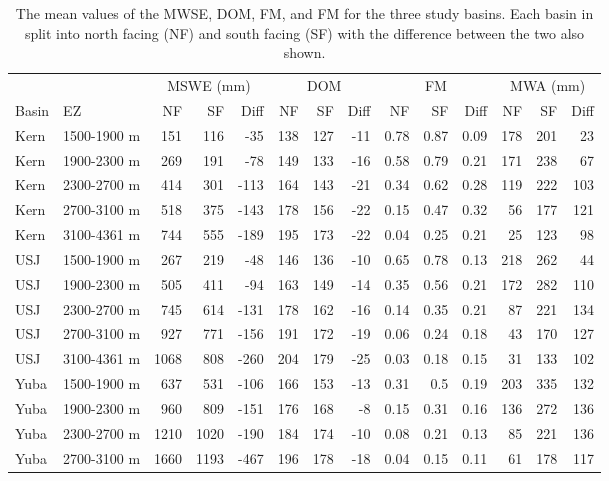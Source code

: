 \begin{table}[htbp]
\centering
\caption{The mean values of the MWSE, DOM, FM, and FM for the three study basins. Each basin in split into north facing (NF) and south facing (SF) with the difference between the two also shown.}
\label{tab:snow_metric_table}
\tiny %
\begin{tabular}{llrrrrrrrrrrrr}
\toprule
& & \multicolumn{3}{c}{MSWE (mm)} & \multicolumn{3}{c}{DOM} & \multicolumn{3}{c}{FM} & \multicolumn{3}{c}{MWA (mm)} \\
\cmidrule(c){3-5} \cmidrule(lr){6-8} \cmidrule(lr){9-11} \cmidrule(lr){12-14} 
Basin & EZ & NF & SF & Diff & NF & SF & Diff & NF & SF & Diff & NF & SF & Diff \\
\midrule
Kern & 1500-1900 m & 151 & 116 & -35 & 138 & 127 & -11 & 0.78 & 0.87 & 0.09 & 178 & 201 & 23 \\
Kern & 1900-2300 m & 269 & 191 & -78 & 149 & 133 & -16 & 0.58 & 0.79 & 0.21 & 171 & 238 & 67 \\
Kern & 2300-2700 m & 414 & 301 & -113 & 164 & 143 & -21 & 0.34 & 0.62 & 0.28 & 119 & 222 & 103 \\
Kern & 2700-3100 m & 518 & 375 & -143 & 178 & 156 & -22 & 0.15 & 0.47 & 0.32 & 56 & 177 & 121 \\
Kern & 3100-4361 m & 744 & 555 & -189 & 195 & 173 & -22 & 0.04 & 0.25 & 0.21 & 25 & 123 & 98 \\
USJ & 1500-1900 m & 267 & 219 & -48 & 146 & 136 & -10 & 0.65 & 0.78 & 0.13 & 218 & 262 & 44 \\
USJ & 1900-2300 m & 505 & 411 & -94 & 163 & 149 & -14 & 0.35 & 0.56 & 0.21 & 172 & 282 & 110 \\
USJ & 2300-2700 m & 745 & 614 & -131 & 178 & 162 & -16 & 0.14 & 0.35 & 0.21 & 87 & 221 & 134 \\
USJ & 2700-3100 m & 927 & 771 & -156 & 191 & 172 & -19 & 0.06 & 0.24 & 0.18 & 43 & 170 & 127 \\
USJ & 3100-4361 m & 1068 & 808 & -260 & 204 & 179 & -25 & 0.03 & 0.18 & 0.15 & 31 & 133 & 102 \\
Yuba & 1500-1900 m & 637 & 531 & -106 & 166 & 153 & -13 & 0.31 & 0.5 & 0.19 & 203 & 335 & 132 \\
Yuba & 1900-2300 m & 960 & 809 & -151 & 176 & 168 & -8 & 0.15 & 0.31 & 0.16 & 136 & 272 & 136 \\
Yuba & 2300-2700 m & 1210 & 1020 & -190 & 184 & 174 & -10 & 0.08 & 0.21 & 0.13 & 85 & 221 & 136 \\
Yuba & 2700-3100 m & 1660 & 1193 & -467 & 196 & 178 & -18 & 0.04 & 0.15 & 0.11 & 61 & 178 & 117 \\
\bottomrule
\end{tabular}
\end{table}


